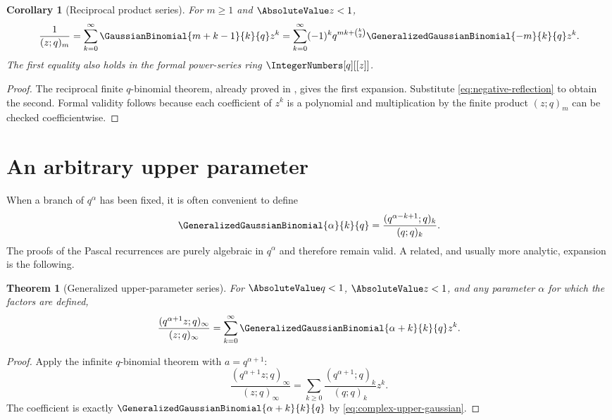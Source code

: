 \documentclass[11pt,a4paper,oneside,openany]{book}
\newtheorem{theorem}{Theorem}[chapter]
\newtheorem{corollary}[corollary]{Corollary}
\theoremstyle{definition}
\theoremstyle{remark}
\begin{document}
\begin{corollary}[Reciprocal product series]\label{cor:reciprocal-product-negative}
For $m\ge1$ and $\AbsoluteValue z<1$,
\[
 \frac1{(z;q)_m}
 =\sum_{k=0}^{\infty}\GaussianBinomial{m+k-1}{k}{q} z^k
 =\sum_{k=0}^{\infty}(-1)^kq^{mk+\binom k2}
   \GeneralizedGaussianBinomial{-m}{k}{q}z^k.
 \label{eq:negative-reciprocal-series}
\]
The first equality also holds in the formal power-series ring $\IntegerNumbers[q][[z]]$.
\end{corollary}

\begin{proof}
The reciprocal finite $q$-binomial theorem, already proved in , gives the first expansion.  Substitute \eqref{eq:negative-reflection} to obtain the second.  Formal validity follows because each coefficient of $z^k$ is a polynomial and multiplication by the finite product $(z;q)_m$ can be checked coefficientwise.
\end{proof}

\section{An arbitrary upper parameter}

When a branch of $q^\alpha$ has been fixed, it is often convenient to define
\[
 \GeneralizedGaussianBinomial{\alpha}{k}{q}
 =\frac{(q^{\alpha-k+1};q)_k}{(q;q)_k}.
 \label{eq:complex-upper-gaussian}
\]
The proofs of the Pascal recurrences are purely algebraic in $q^\alpha$ and therefore remain valid.  A related, and usually more analytic, expansion is the following.

\begin{theorem}[Generalized upper-parameter series]\label{thm:upper-parameter-series}
For $\AbsoluteValue q<1$, $\AbsoluteValue z<1$, and any parameter $\alpha$ for which the factors are defined,
\[
 \frac{(q^{\alpha+1}z;q)_\infty}{(z;q)_\infty}
 =\sum_{k=0}^{\infty}
   \GeneralizedGaussianBinomial{\alpha+k}{k}{q} z^k.
 \label{eq:upper-parameter-series}
\]
\end{theorem}

\begin{proof}
Apply the infinite $q$-binomial theorem with $a=q^{\alpha+1}$:
\[
 \frac{(q^{\alpha+1}z;q)_\infty}{(z;q)_\infty}
 =\sum_{k\ge0}\frac{(q^{\alpha+1};q)_k}{(q;q)_k}z^k.
\]
The coefficient is exactly $\GeneralizedGaussianBinomial{\alpha+k}{k}{q}$ by \eqref{eq:complex-upper-gaussian}.
\end{proof}
\end{document}
